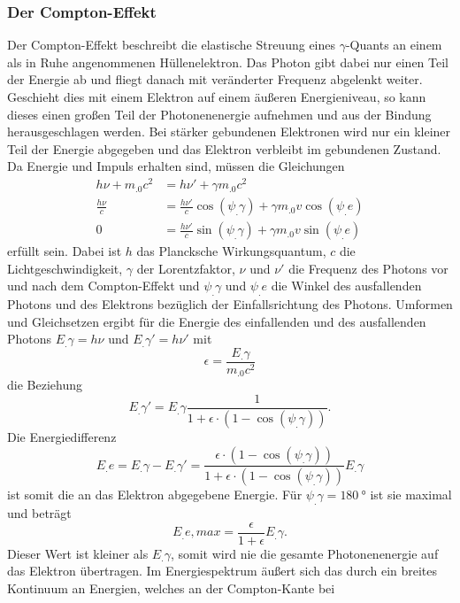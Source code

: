 \subsubsection{Der Compton-Effekt}

Der Compton-Effekt beschreibt die elastische Streuung eines $\gamma$-Quants an einem als in Ruhe angenommenen Hüllenelektron. Das Photon gibt dabei nur einen Teil der Energie ab und fliegt danach mit veränderter Frequenz abgelenkt weiter. Geschieht dies mit einem Elektron auf einem äußeren Energieniveau, so kann dieses einen großen Teil der Photonenenergie aufnehmen und aus der Bindung herausgeschlagen werden. Bei stärker gebundenen Elektronen wird nur ein kleiner Teil der Energie abgegeben und das Elektron verbleibt im gebundenen Zustand.
Da Energie und Impuls erhalten sind, müssen die Gleichungen
\begin{align*}
h \nu + m_.0 c^2 &= h \nu '+ \gamma m_.0 c^2\\
\frac{h \nu}{c}&= \frac{h \nu '}{c}\cos(\psi_.{\gamma})+\gamma m_.0 v\cos(\psi_.e)\\
0&= \frac{h\nu '}{c}\sin(\psi_.{\gamma})+\gamma m_.0 v\sin(\psi_.e)
\end{align*}
erfüllt sein. Dabei ist $h$ das Plancksche Wirkungsquantum, $c$ die Lichtgeschwindigkeit, $\gamma$ der Lorentzfaktor, $\nu$ und $\nu '$ die Frequenz des Photons vor und nach dem Compton-Effekt und $\psi_.{\gamma}$ und $\psi_.e$ die Winkel des ausfallenden Photons und des Elektrons bezüglich der Einfallsrichtung des Photons.
Umformen und Gleichsetzen ergibt für die Energie des einfallenden und des ausfallenden Photons $E_.{\gamma}=h\nu$ und $E_.{\gamma}'=h\nu '$ mit \[\epsilon=\frac{E_.{\gamma}}{m_.0c^2}\] die Beziehung
\begin{equation}
E_.{\gamma}'= E_.{\gamma}\frac{1}{1+\epsilon\cdot\left(1-\cos(\psi_.{\gamma})\right)}\text{.}
\end{equation}
Die Energiedifferenz
\begin{equation}
E_.e=E_.{\gamma}-E_.{\gamma}' =\frac{\epsilon\cdot\left(1-\cos(\psi_.{\gamma})\right)}{1+\epsilon\cdot\left(1-\cos(\psi_.{\gamma})\right)}E_.{\gamma}
\end{equation}
ist somit die an das Elektron abgegebene Energie.
Für $\psi_.{\gamma}=\SI{180}{\degree}$ ist sie maximal und beträgt
\begin{equation}
E_.{e,max}=\frac{\epsilon}{1+\epsilon}E_.{\gamma}\text{.}
\end{equation}
Dieser Wert ist kleiner als $E_.{\gamma}$, somit wird nie die gesamte Photonenenergie auf das Elektron übertragen. Im Energiespektrum äußert sich das durch ein breites Kontinuum an Energien, welches an der Compton-Kante bei
